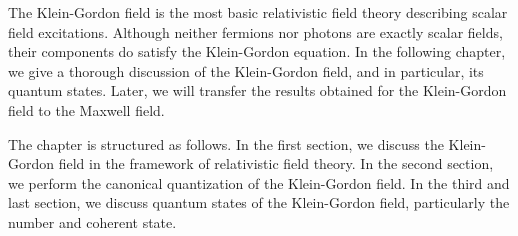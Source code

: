 The Klein-Gordon field is the most basic relativistic field theory describing scalar field excitations.
Although neither fermions nor photons are exactly scalar fields, their components do satisfy the Klein-Gordon equation.
In the following chapter, we give a thorough discussion of the Klein-Gordon field, and in particular, its quantum states.
Later, we will transfer the results obtained for the Klein-Gordon field to the Maxwell field.

The chapter is structured as follows.
In the first section, we discuss the Klein-Gordon field in the framework of relativistic field theory.
In the second section, we perform the canonical quantization of the Klein-Gordon field.
In the third and last section, we discuss quantum states of the Klein-Gordon field, particularly the number and coherent state.
